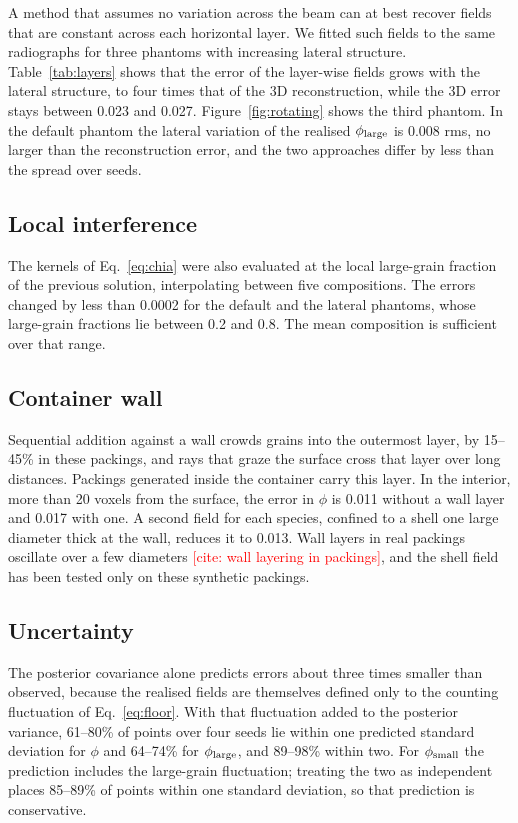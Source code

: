 \documentclass[11pt]{article}
\newcommand{\todo}[1]{\textcolor{red}{[#1]}}
\begin{document}
A method that assumes no variation across the beam can at best recover
fields that are constant across each horizontal layer. We fitted such fields
to the same radiographs for three phantoms with increasing lateral
structure. Table~\ref{tab:layers} shows that the error of the layer-wise
fields grows with the lateral structure, to four times that of the 3D
reconstruction, while the 3D error stays between 0.023 and 0.027.
Figure~\ref{fig:rotating} shows the third phantom. In the default phantom
the lateral variation of the realised $\phi_{\rm large}$ is 0.008 rms, no
larger than the reconstruction error, and the two approaches differ by less
than the spread over seeds.

\subsection{Local interference}\label{sec:local}

The kernels of Eq.~\eqref{eq:chia} were also evaluated at the local
large-grain fraction of the previous solution, interpolating between five
compositions. The errors changed by less than 0.0002 for the default and
the lateral phantoms, whose large-grain fractions lie between 0.2 and 0.8.
The mean composition is sufficient over that range.

\subsection{Container wall}\label{sec:wall}

Sequential addition against a wall crowds grains into the outermost layer,
by 15--45\% in these packings, and rays that graze the surface cross that
layer over long distances. Packings generated inside the container carry
this layer. In the interior, more than 20 voxels from the surface, the
error in $\phi$ is 0.011 without a wall layer and 0.017 with one. A second
field for each species, confined to a shell one large diameter thick at the
wall, reduces it to 0.013. Wall layers in real packings oscillate over a few
diameters \todo{cite: wall layering in packings}, and the shell field has
been tested only on these synthetic packings.

\subsection{Uncertainty}

The posterior covariance alone predicts errors about three times smaller
than observed, because the realised fields are themselves defined only to
the counting fluctuation of Eq.~\eqref{eq:floor}. With that fluctuation
added to the posterior variance, 61--80\% of points over four seeds lie
within one predicted standard deviation for $\phi$ and 64--74\% for
$\phi_{\rm large}$, and 89--98\% within two. For $\phi_{\rm small}$ the
prediction includes the large-grain fluctuation; treating the two as
independent places 85--89\% of points within one standard deviation, so
that prediction is conservative.
\end{document}
